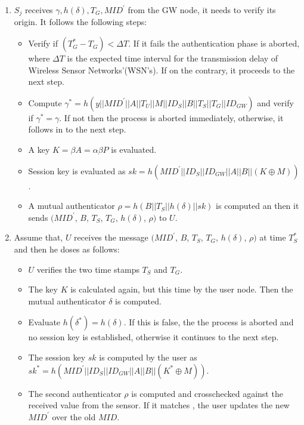 \documentclass[a4paper,12pt]{report}
\begin{document}
\begin{enumerate}
\item $S_{j}$ receives ${\gamma, h(\delta), T_G, MID^{\prime}}$ from the GW node, it
needs to verify its origin. It follows the following steps:
\begin{itemize}
 \item Verify if $(T_{G}^{*}-T_{G})<\Delta T$. If it fails the authentication phase is aborted, where $\Delta T$ is the expected time interval for the transmission delay of Wireless Sensor Networks'(WSN's). If on the contrary, it proceeds to the next step.
 \item Compute  $\gamma^{*} = h(y||MID^{\prime}||A||T_U||M||ID_S||B||T_S||T_G||ID_{GW})$ and verify if  $\gamma ^*= \gamma$. If not then the process is aborted immediately, otherwise, it follows in to the next step.
 \item A key  $K =  \beta A = \alpha \beta P $ is evaluated.
 \item Session key is evaluated as $sk = h(MID^{\prime}||ID_S||ID_{GW}||A||B||(K\oplus M))$.
 \item A mutual authenticator $\rho = h(B ||T_S||h( \delta)||sk)$ is computed an then  it sends $(MID^{\prime}$, $B$, $T_S$, $T_G$, $h(\delta)$, $\rho)$ to $U$.
\end{itemize}

 \item Assume that, $U$ receives the message $(MID^{\prime}$, $B$, $T_S$, $T_G$, $h(\delta)$, $\rho)$ at time $T_{S}^{*}$ and then he doses as follows:
\begin{itemize}
 \item $U$ verifies the two time stamps $T_S$ and $T_G$.
 \item The key $K$ is calculated again, but this time by the user node. Then the mutual authenticator $ \delta $ is computed.
 \item Evaluate $h(\delta ^*) = h(\delta)$. If this is false, the the process is aborted and no session key is established, otherwise it continues to the next step.
 \item The session key $sk$ is computed by the user as $sk^* = h(MID^{\prime}||ID_S||ID_{GW}||A||B||(K^* \oplus M))$.
 \item The second authenticator $\rho$ is computed and crosschecked against the received value from the sensor. If it matches , the user updates the new $MID^{\prime}$ over the old $MID$.
\end{itemize}

\end{enumerate}
\end{document}
